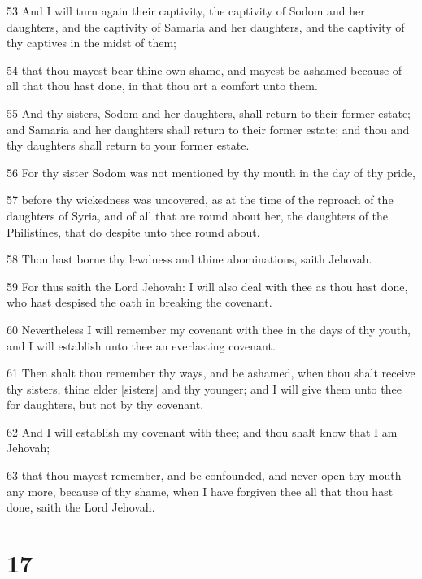 \par 53 And I will turn again their captivity, the captivity of Sodom and her daughters, and the captivity of Samaria and her daughters, and the captivity of thy captives in the midst of them;
\par 54 that thou mayest bear thine own shame, and mayest be ashamed because of all that thou hast done, in that thou art a comfort unto them.
\par 55 And thy sisters, Sodom and her daughters, shall return to their former estate; and Samaria and her daughters shall return to their former estate; and thou and thy daughters shall return to your former estate.
\par 56 For thy sister Sodom was not mentioned by thy mouth in the day of thy pride,
\par 57 before thy wickedness was uncovered, as at the time of the reproach of the daughters of Syria, and of all that are round about her, the daughters of the Philistines, that do despite unto thee round about.
\par 58 Thou hast borne thy lewdness and thine abominations, saith Jehovah.
\par 59 For thus saith the Lord Jehovah: I will also deal with thee as thou hast done, who hast despised the oath in breaking the covenant.
\par 60 Nevertheless I will remember my covenant with thee in the days of thy youth, and I will establish unto thee an everlasting covenant.
\par 61 Then shalt thou remember thy ways, and be ashamed, when thou shalt receive thy sisters, thine elder [sisters] and thy younger; and I will give them unto thee for daughters, but not by thy covenant.
\par 62 And I will establish my covenant with thee; and thou shalt know that I am Jehovah;
\par 63 that thou mayest remember, and be confounded, and never open thy mouth any more, because of thy shame, when I have forgiven thee all that thou hast done, saith the Lord Jehovah.

\chapter{17}

